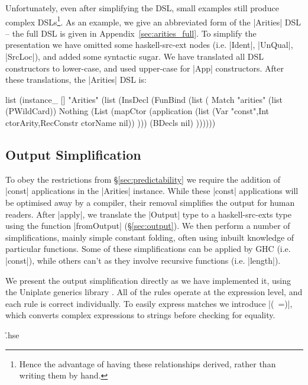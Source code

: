 \documentclass[preprint,draft]{sigplanconf}
\begin{document}
Unfortunately, even after simplifying the DSL, small examples still produce complex DSLs\footnote{Hence the advantage of having these relationships derived, rather than writing them by hand.}. As an example, we give an abbreviated form of the |Arities| DSL -- the full DSL is given in Appendix~\ref{sec:arities_full}. To simplify the presentation we have omitted some haskell-src-ext nodes (i.e. |Ident|, |UnQual|, |SrcLoc|), and added some syntactic sugar. We have translated all DSL constructors to lower-case, and used upper-case for |App| constructors. After these translations, the |Arities| DSL is:

\ignore\begin{code}
list (instance_ [] "Arities" (list (InsDecl (FunBind (list (
    Match "arities"
        (list (PWildCard))
        Nothing
        (List (mapCtor (application
            (list (Var "const",Int ctorArity,RecConstr ctorName nil))
        )))
        (BDecls nil)
))))))
\end{code}

\subsection{Output Simplification}
\label{sec:output_simplify}

To obey the restrictions from \S\ref{sec:predictability} we require the addition of |const| applications in the |Arities| instance. While these |const| applications will be optimised away by a compiler, their removal simplifies the output for human readers. After |apply|, we translate the |Output| type to a haskell-src-exts type using the function |fromOutput| (\S\ref{sec:output}). We then perform a number of simplifications, mainly simple constant folding, often using inbuilt knowledge of particular functions. Some of these simplifications can be applied by GHC (i.e. |const|), while others can't as they involve recursive functions (i.e. |length|).

We present the output simplification directly as we have implemented it, using the Uniplate generics library \cite{me:uniplate}. All of the rules operate at the expression level, and each rule is correct individually. To easily express matches we introduce |(~=)|, which converts complex expressions to strings before checking for equality.

\h{.hse}
\end{document}
